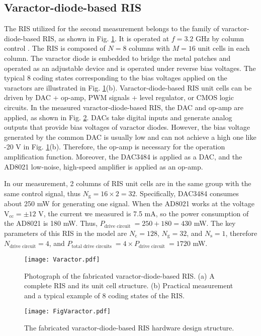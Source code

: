 \documentclass[journal]{IEEEtran}
\begin{document}
\subsection{Varactor-diode-based RIS}

The RIS utilized for the second measurement belongs to the family of varactor-diode-based RIS, as shown in Fig. \ref{4}. It is  operated at $f=3.2 $ GHz by column control \cite{liang9632392}. The RIS is composed of $N=8$ columns with $M=16$ unit cells in each column. The varactor diode is embedded to bridge the metal patches and operated as an adjustable device and is operated under reverse bias voltages. The typical 8 coding states corresponding to the bias voltages applied on the varactors are illustrated in Fig. \ref{4}(b). Varactor-diode-based RIS unit cells can be driven by DAC + op-amp, PWM signals + level regulator, or CMOS logic circuits. In the measured varactor-diode-based RIS, the DAC and op-amp are applied, as shown in Fig. \ref{5}. DACs take digital inputs and generate analog outputs that provide bias voltages of varactor diodes. However, the bias voltage generated by the common DAC is usually low and can not achieve a high one like -20 V in Fig. \ref{4}(b). Therefore, the op-amp is necessary for the operation amplification function. Moreover, the DAC3484 is applied as a DAC, and the AD8021 low-noise, high-speed amplifier is applied as an op-amp. 

In our measurement, 2 columns of RIS unit cells are in the same group with the same control signal, thus $N_{\text {g}}= 16 \times 2 =32$. Specifically, DAC3484 consumes about 250 mW for generating one signal. When the AD8021 works at the voltage $\mathrm{V}_\text {cc}= \pm 12 $ V, the current we measured is 7.5 mA, so the power consumption of the AD8021 is 180 mW. Thus, $P_{\text {drive circuit }}= 250 + 180= 430 $ mW. The key parameters of this RIS in the model are $N_{\mathrm{c}}=128$, $N_{\mathrm{g}}=32$, and $N_{\mathrm{s}}=1$, therefore $N_{\text {drive circuit}}= 4$, and $P_{\text {total drive circuits }}= 4 \times P_{\text {drive circuit }} = 1720 $ mW. 

\begin{figure}
\centering
\texttt{[image: Varactor.pdf]}
\caption{Photograph of the fabricated varactor-diode-based RIS. (a) A complete RIS and its unit cell structure. (b) Practical measurement and a typical example of 8 coding states of the RIS.}
\label{4} 
\vspace{-0.2cm}
\end{figure}
\begin{figure}
\centering
\texttt{[image: FigVaractor.pdf]}
\caption{The fabricated varactor-diode-based RIS hardware design structure.}
\label{5}
\vspace{-0.2cm}
\end{figure}
\end{document}
